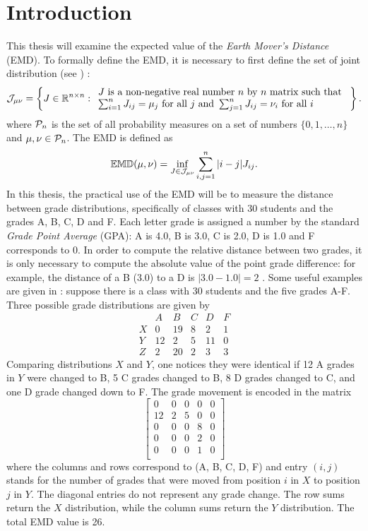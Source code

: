 \documentclass[12pt,letterpaper,oneside,openany]{book}
\begin{document}
\chapter{Introduction}
This thesis will examine the expected value of the \emph{Earth Mover's Distance} (EMD).  To formally define the EMD, it is necessary to first define the set of joint distribution (see \cite{bourn2019expected}) :
\[
{\mathcal{J}}_{\mu \nu} = \left\{ J \in {\mathbb{R}}^{n \times n} :
\begin{array}{l}
J \mbox{ is a non-negative real number $n$ by $n$ matrix such that } \\
\sum_{i=1}^n J_{ij} = \mu_j \mbox{ for all } j  \mbox{ and }
\sum_{j=1}^n J_{ij} = \nu_i \mbox{ for all } i
\end{array}
\right\}.
\]
where ${\mathcal{P}}_n$ is the set of all probability measures on a set of numbers $\{0, 1, …, n\}$ and $\mu, \nu \in {\mathcal{P}}_n$.
The EMD is defined as
\[
{\mathbb{EMD}}(\mu, \nu) = \inf_{J \in {\mathcal{J}}_{\mu \nu}} \sum_{i,j = 1}^n |i-j| J_{ij}.
\]
In this thesis, the practical use of the EMD will be to measure the distance between grade distributions, specifically of classes with 30 students and the grades A, B, C, D and F. Each letter grade is assigned a number by the standard \emph{Grade Point Average} (GPA): A is 4.0, B is  3.0, C is 2.0, D is 1.0 and F corresponds to 0.
In order to compute the relative distance between two grades, it is only necessary to compute the absolute value of the point grade difference: for example, the distance of a B (3.0) to a D is $|3.0-1.0|=2$ .
Some useful examples are given in \cite{bourn2019expected}: suppose there is a class with 30 students and the five grades A-F. Three possible grade distributions are given by 
\[
\begin{array}{c|ccccc}
&  A &  B &  C &  D &  F \\ \hline
X &  0 & 19 &  8 &  2 &  1 \\
Y & 12 &  2 &  5 & 11 &  0 \\
Z &  2 & 20 &  2 &  3 &  3
\end{array}
\]
Comparing distributions $X$ and $Y$, one notices they were identical if  12 A grades in $Y$ were changed to B, 5 C grades changed to B, 8 D grades  changed to C, and one D grade changed down to F. The grade movement is encoded in the matrix
\[
\left[
\begin{array}{ccccc}
0 & 0 & 0 & 0 & 0 \\
12 & 2 & 5 & 0 & 0 \\
0 & 0 & 0 & 8 & 0 \\
0 & 0 & 0 & 2 & 0 \\
0 & 0 & 0 & 1 & 0 \\
\end{array}
\right]
\]
where the columns and rows correspond to (A, B, C, D, F) and entry $(i,j)$ stands for the number of grades that were moved from position $i$ in $X$ to position $j$ in $Y$. The diagonal entries do not represent any grade change. The row sums return the $X$ distribution, while the column sums return the $Y$ distribution. The total EMD value is 26.
\end{document}
